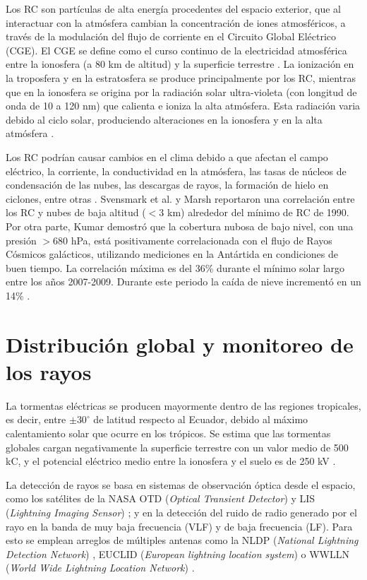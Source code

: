 \documentclass[11pt,oneside,openany,letter]{book}
\begin{document}
Los RC son partículas de alta energía procedentes del espacio exterior, que al interactuar con la atmósfera cambian la concentración de iones atmosféricos, a través de la modulación del flujo de corriente en el Circuito Global Eléctrico (CGE). El CGE se define como el curso continuo de la electricidad atmosférica entre la ionosfera (a 80 km de altitud) y la superficie terrestre \cite{FullekrugEtal2006}. La ionización en la troposfera y en la estratosfera se produce principalmente por los RC, mientras que en la ionosfera se origina por la radiación solar ultra-violeta (con longitud de onda de 10 a 120 nm) que calienta e ioniza la alta atmósfera. Esta radiación varia debido al ciclo solar, produciendo alteraciones en la ionosfera y en la alta atmósfera \cite{KumarEtal2018}.   

Los RC podrían causar cambios en el clima debido a que afectan el campo el\'ectrico, la corriente, la conductividad en la atmósfera, las tasas de núcleos de condensación de las nubes, las descargas de rayos, la formaci\'on de hielo en ciclones, entre otras \cite{KumarEtal2018}. Svensmark et al. \cite{SvensmarkETal1997} y Marsh \cite{MarshSvensmark2000} reportaron una correlación entre los RC y nubes de baja altitud ($<3$ km) alrededor del mínimo de RC de 1990. Por otra parte, Kumar \cite{Kumar2017} demostró que la cobertura nubosa de bajo nivel, con una presión $> 680$ hPa, está positivamente correlacionada con el flujo de Rayos Cósmicos galácticos, utilizando mediciones en la Antártida en condiciones de buen tiempo. La correlación máxima es del 36\% durante el mínimo solar largo entre los años 2007-2009. Durante este periodo la ca\'ida de nieve increment\'o en un 14\% \cite{KumarEtal2018}. 

\section{Distribución global y monitoreo de los rayos}
La tormentas eléctricas se producen mayormente dentro de las regiones tropicales, es decir, entre $\pm 30^{\circ}$ de latitud respecto al Ecuador, debido al máximo calentamiento solar que ocurre en los trópicos. Se estima que las tormentas globales cargan negativamente la superficie terrestre con un valor medio de 500 kC, y el potencial eléctrico medio entre la ionosfera y el suelo es de 250 kV \cite{FullekrugEtal2006}. 

La detección de rayos se basa en sistemas de observación óptica desde el espacio, como los satélites de la NASA OTD (\textit{Optical Transient Detector}) \cite{ChristianEtal2003} y LIS (\textit{Lightning Imaging Sensor}) \cite{Christian1992}; y en la detección del ruido de radio generado por el rayo en la banda de muy baja frecuencia (VLF) y de baja frecuencia (LF). Para esto se emplean arreglos de múltiples antenas como la NLDP (\textit{National Lightning Detection Network}) \cite{CumminsEtal1998}, EUCLID (\textit{European lightning location system}) \cite{SchulzEtal2016} o WWLLN (\textit{World Wide Lightning Location Network}) \cite{RodgerEtal2004}.
\end{document}
